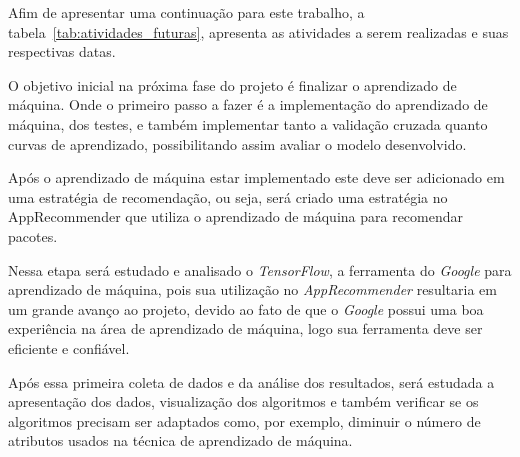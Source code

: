 Afim de apresentar uma continuação para este trabalho, a tabela~\ref{tab:atividades_futuras},
apresenta as atividades a serem realizadas e suas respectivas datas.

\begin{table}[h]
\centering
{}
\caption{Atividades a serem realizadas}
\label{tab:atividades_futuras}
\end{table}

O objetivo inicial na próxima fase do projeto é finalizar o aprendizado
de máquina. Onde o primeiro passo a fazer é a implementação do aprendizado
de máquina, dos testes, e também implementar tanto a validação cruzada quanto
curvas de aprendizado, possibilitando assim avaliar o modelo desenvolvido.

Após o aprendizado de máquina estar implementado este deve ser adicionado
em uma estratégia de recomendação, ou seja, será criado uma estratégia
no AppRecommender que utiliza o aprendizado de máquina para recomendar
pacotes.

Nessa etapa será estudado e analisado o \textit{TensorFlow}, a ferramenta do
\textit{Google} para aprendizado de máquina, pois sua utilização no
\textit{AppRecommender} resultaria em um grande avanço ao projeto, devido ao fato de que o
\textit{Google} possui uma boa experiência na área de aprendizado de máquina,
logo sua ferramenta deve ser eficiente e confiável.

Após essa primeira coleta de dados e da análise dos resultados, será
estudada a apresentação dos dados, visualização dos algoritmos e também
verificar se os algoritmos precisam ser adaptados como, por exemplo,
diminuir o número de atributos usados na técnica de aprendizado de máquina.

